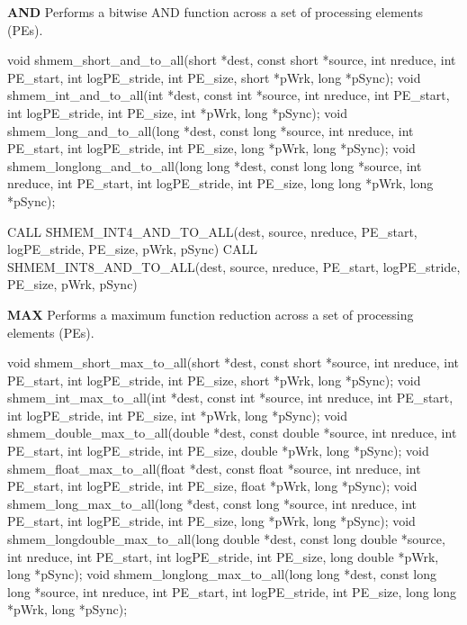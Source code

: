 
\begin{apidefinition}

\textbf{AND} \newline
Performs a bitwise AND function across a set of processing elements (\acp{PE}).\newline
\begin{Csynopsis}
void shmem_short_and_to_all(short *dest, const short *source, int nreduce, int PE_start, int logPE_stride, int PE_size, short *pWrk, long *pSync);
void shmem_int_and_to_all(int *dest, const int *source, int nreduce, int PE_start, int logPE_stride, int PE_size, int *pWrk, long *pSync);
void shmem_long_and_to_all(long *dest, const long *source, int nreduce, int PE_start, int logPE_stride, int PE_size, long *pWrk, long *pSync);
void shmem_longlong_and_to_all(long long *dest, const long long *source, int nreduce, int PE_start, int logPE_stride, int PE_size, long long *pWrk, long *pSync);
\end{Csynopsis}

\begin{Fsynopsis}
CALL SHMEM_INT4_AND_TO_ALL(dest, source, nreduce, PE_start, logPE_stride, PE_size, pWrk, pSync)
CALL SHMEM_INT8_AND_TO_ALL(dest, source, nreduce, PE_start, logPE_stride, PE_size, pWrk, pSync)
\end{Fsynopsis}

\bigskip
\textbf{MAX} \newline
Performs a maximum function reduction across a set of processing elements (\acp{PE}).\newline
\begin{Csynopsis}
void shmem_short_max_to_all(short *dest, const short *source, int nreduce, int PE_start, int logPE_stride, int PE_size, short *pWrk, long *pSync);
void shmem_int_max_to_all(int *dest, const int *source, int nreduce, int PE_start, int logPE_stride, int PE_size, int *pWrk, long *pSync);
void shmem_double_max_to_all(double *dest, const double *source, int nreduce, int PE_start, int logPE_stride, int PE_size, double *pWrk, long *pSync);
void shmem_float_max_to_all(float *dest, const float *source, int nreduce, int PE_start, int logPE_stride, int PE_size, float *pWrk, long *pSync);
void shmem_long_max_to_all(long *dest, const long *source, int nreduce, int PE_start, int logPE_stride, int PE_size, long *pWrk, long *pSync);
void shmem_longdouble_max_to_all(long double *dest, const long double *source, int nreduce, int PE_start, int logPE_stride, int PE_size, long double *pWrk, long *pSync);
void shmem_longlong_max_to_all(long long *dest, const long long *source, int nreduce, int PE_start, int logPE_stride, int PE_size, long long *pWrk, long *pSync);
\end{Csynopsis}


\end{apidefinition}
